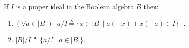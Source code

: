 If $I$ is a proper ideal in the Boolean algebra $B$ then:
\begin{enumerate}
\item $(\forall a \in |B|)[a/I \triangleq \{x \in |B| \mid a(-x) + x(-a) \in I\}]$.
\item $|B|/I \triangleq \{a/I \mid a \in |B|\}$.
\end{enumerate}

